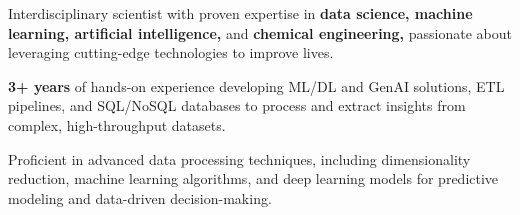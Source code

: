

\begin{cvparagraph}
    \vspace{0.5cm}
    \begin{cvitemsfree}
        \item{Interdisciplinary scientist with proven expertise in \textbf{data science, machine learning, artificial intelligence,} and \textbf{chemical engineering,} passionate about leveraging cutting-edge technologies to improve lives.}
                
        \item{\textbf{3+ years} of hands-on experience developing ML/DL and GenAI solutions, ETL pipelines, and SQL/NoSQL databases to process and extract insights from complex, high-throughput datasets.}
                
        \item{Proficient in advanced data processing techniques, including dimensionality reduction, machine learning algorithms, and deep learning models for predictive modeling and data-driven decision-making.}
                
                
    \end{cvitemsfree}


\end{cvparagraph}
